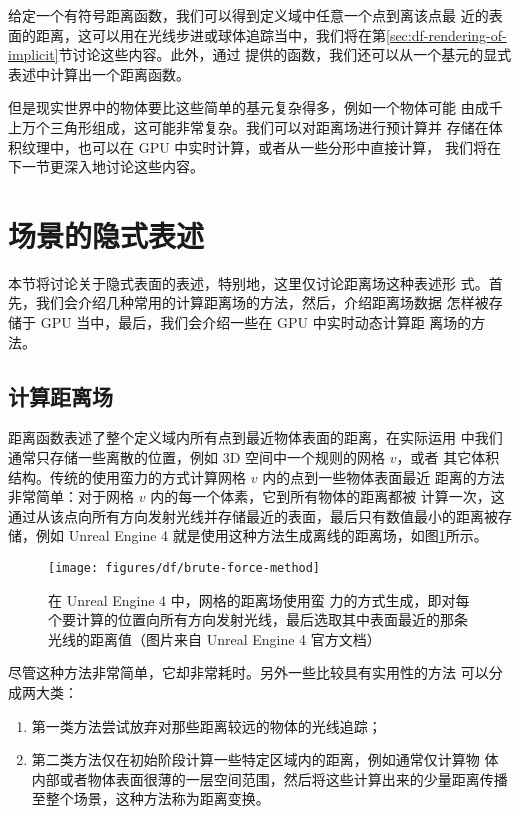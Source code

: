 给定一个有符号距离函数，我们可以得到定义域中任意一个点到离该点最 近的表面的距离，这可以用在光线步进或球体追踪当中，我们将在第\ref{sec:df-rendering-of-implicit}节讨论这些内容。此外，通过 \cite{w:distance-function} 提供的函数，我们还可以从一个基元的显式 表述中计算出一个距离函数。

但是现实世界中的物体要比这些简单的基元复杂得多，例如一个物体可能 由成千上万个三角形组成，这可能非常复杂。我们可以对距离场进行预计算并 存储在体积纹理中，也可以在 GPU 中实时计算，或者从一些分形中直接计算， 我们将在下一节更深入地讨论这些内容。



\section{场景的隐式表述}
本节将讨论关于隐式表面的表述，特别地，这里仅讨论距离场这种表述形 式。首先，我们会介绍几种常用的计算距离场的方法，然后，介绍距离场数据 怎样被存储于 GPU 当中，最后，我们会介绍一些在 GPU 中实时动态计算距 离场的方法。


\subsection{计算距离场}
距离函数表述了整个定义域内所有点到最近物体表面的距离，在实际运用 中我们通常只存储一些离散的位置，例如 3D 空间中一个规则的网格 $v$，或者 其它体积结构。传统的使用蛮力的方式计算网格 $v$ 内的点到一些物体表面最近 距离的方法非常简单：对于网格 $v$ 内的每一个体素，它到所有物体的距离都被 计算一次，这通过从该点向所有方向发射光线并存储最近的表面，最后只有数值最小的距离被存储，例如 Unreal Engine 4 就是使用这种方法生成离线的距离场，如图\ref{f:df-brute-force-method}所示。

\begin{figure}
	\sidecaption
	\texttt{[image: figures/df/brute-force-method]}
	\caption{在 Unreal Engine 4 中，网格的距离场使用蛮 力的方式生成，即对每个要计算的位置向所有方向发射光线，最后选取其中表面最近的那条光线的距离值（图片来自 Unreal Engine 4 官方文档）}
	\label{f:df-brute-force-method}
\end{figure}

尽管这种方法非常简单，它却非常耗时。另外一些比较具有实用性的方法 可以分成两大类：

\begin{enumerate}
	\item 第一类方法尝试放弃对那些距离较远的物体的光线追踪；
	\item 第二类方法仅在初始阶段计算一些特定区域内的距离，例如通常仅计算物 体内部或者物体表面很薄的一层空间范围，然后将这些计算出来的少量距离传播至整个场景，这种方法称为距离变换。
\end{enumerate}

